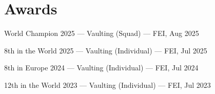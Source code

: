\section*{Awards}

\begin{tightlist}
  \item World Champion 2025 --- Vaulting (Squad) --- FEI, Aug 2025
  \item 8th in the World 2025 --- Vaulting (Individual) --- FEI, Jul 2025
  \item 8th in Europe 2024 --- Vaulting (Individual) --- FEI, Jul 2024
  \item 12th in the World 2023 --- Vaulting (Individual) --- FEI, Jul 2023
\end{tightlist}
